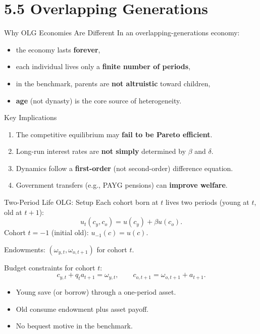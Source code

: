 \documentclass[aspectratio=169,10pt]{beamer}
\begin{document}
\section{5.5 Overlapping Generations}

\begin{frame}{Why OLG Economies Are Different}
In an overlapping-generations economy:
\begin{itemize}
  \item the economy lasts \textbf{forever},
  \item each individual lives only a \textbf{finite number of periods},
  \item in the benchmark, parents are \textbf{not altruistic} toward children,
  \item \textbf{age} (not dynasty) is the core source of heterogeneity.
\end{itemize}

\begin{block}{Key Implications}
\begin{enumerate}
  \item The competitive equilibrium may \textbf{fail to be Pareto efficient}.
  \item Long-run interest rates are \textbf{not simply} determined by $\beta$ and $\delta$.
  \item Dynamics follow a \textbf{first-order} (not second-order) difference equation.
  \item Government transfers (e.g., PAYG pensions) can \textbf{improve welfare}.
\end{enumerate}
\end{block}
\end{frame}

\begin{frame}{Two-Period Life OLG: Setup}
Each cohort born at $t$ lives two periods (young at $t$, old at $t+1$):
\[
u_t(c_y,c_o) = u(c_y)+\beta u(c_o).
\]
Cohort $t=-1$ (initial old): $u_{-1}(c)=u(c)$.

\medskip
Endowments: $(\omega_{y,t}, \omega_{o,t+1})$ for cohort $t$.

\medskip
Budget constraints for cohort $t$:
\[
c_{y,t}+q_t a_{t+1}=\omega_{y,t},
\qquad
c_{o,t+1}=\omega_{o,t+1}+a_{t+1}.
\]

\begin{itemize}
  \item Young save (or borrow) through a one-period asset.
  \item Old consume endowment plus asset payoff.
  \item No bequest motive in the benchmark.
\end{itemize}
\end{frame}
\end{document}

